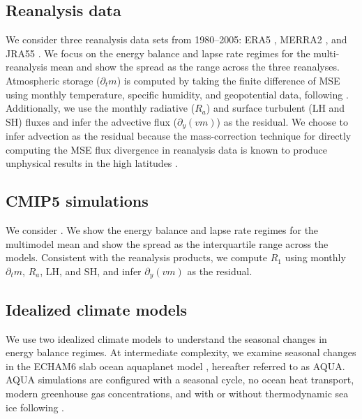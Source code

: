 \documentclass{ametsocV5}
\begin{document}
    \subsection{Reanalysis data}\label{subsec:reanalysis}
    We consider three reanalysis data sets from 1980--2005: ERA5 \citep{hersbach2020}, MERRA2 \citep{gelaro2017}, and JRA55 \citep{kobayashi2015}. We focus on the energy balance and lapse rate regimes for the multi-reanalysis mean and show the spread as the range across the three reanalyses. Atmospheric storage ($\partial_t m$) is computed by taking the finite difference of MSE using monthly temperature, specific humidity, and geopotential data, following \cite{donohoe2013}. Additionally, we use the monthly radiative ($R_a$) and surface turbulent ($\mathrm{LH}$ and $\mathrm{SH}$) fluxes and infer the advective flux ($\partial_y (vm)$) as the residual. We choose to infer advection as the residual because the mass-correction technique for directly computing the MSE flux divergence in reanalysis data is known to produce unphysical results in the high latitudes \citep{porter2010}. 

    \subsection{CMIP5 simulations}\label{subsec:cmip}
    We consider  \citep[Table~B1,][]{taylor2012}. We show the energy balance and lapse rate regimes for the multimodel mean and show the spread as the interquartile range across the models. Consistent with the reanalysis products, we compute $R_1$ using monthly $\partial_t m$, $R_a$, $\mathrm{LH}$, and $\mathrm{SH}$, and infer $\partial_y (vm) $ as the residual.

    \subsection{Idealized climate models}\label{subsec:models}
    We use two idealized climate models to understand the seasonal changes in energy balance regimes. At intermediate complexity, we examine seasonal changes in the ECHAM6 slab ocean aquaplanet model \citep{stevens2013}, hereafter referred to as AQUA. AQUA simulations are configured with a seasonal cycle, no ocean heat transport, modern greenhouse gas concentrations, and with or without thermodynamic sea ice following \cite{shaw2020}. 
    
\end{document}
